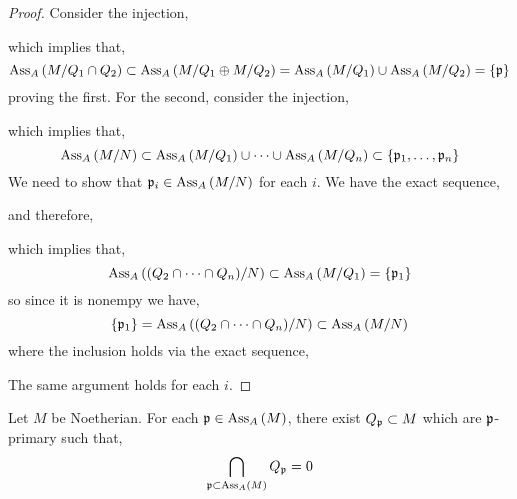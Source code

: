 \documentclass[12pt]{article}
\begin{document}
\begin{proof}
Consider the injection,
\begin{center}
\end{center}
which implies that,
\[ \mathrm{Ass}_{A}\left( M / Q_1 \cap Q_2 \right) \subset \mathrm{Ass}_{A}\left( M / Q_1 \oplus M / Q_2 \right) = \mathrm{Ass}_{A}\left( M/Q_1 \right) \cup \mathrm{Ass}_{A}\left( M/Q_2 \right) = \{ \mathfrak{p} \} \]
proving the first.
For the second, consider the injection,
\begin{center}
\end{center}
which implies that,
\[ \mathrm{Ass}_{A}\left( M / N \right) \subset \mathrm{Ass}_{A}\left( M/Q_1 \right) \cup \cdots \cup \mathrm{Ass}_{A}\left( M/Q_n \right) \subset \{ \mathfrak{p}_1, \dots, \mathfrak{p}_n \} \]
We need to show that $\mathfrak{p}_i \in \mathrm{Ass}_{A}\left( M / N \right)$ for each $i$.
We have the exact sequence,
\begin{center}
\end{center}
and therefore,
\begin{center}
\end{center}
which implies that,
\[ \mathrm{Ass}_{A}\left( (Q_2 \cap \cdots \cap Q_n) / N \right) \subset \mathrm{Ass}_{A}\left( M / Q_1 \right) = \{ \mathfrak{p}_1 \} \]
so since it is nonempy we have,
\[ \{ \mathfrak{p}_1 \} = \mathrm{Ass}_{A}\left( (Q_2 \cap \cdots \cap Q_n) / N \right) \subset \mathrm{Ass}_{A}\left( M / N \right) \]
where the inclusion holds via the exact sequence,
\begin{center}
\end{center}
The same argument holds for each $i$. 
\end{proof}

\begin{theorem}
Let $M$ be Noetherian. For each $\mathfrak{p} \in \mathrm{Ass}_{A}\left( M \right)$, there exist $Q_{\mathfrak{p}} \subset M$ which are $\mathfrak{p}$-primary such that,
\[ \bigcap_{\mathfrak{p} \subset \mathrm{Ass}_{A}\left( M \right)} Q_{\mathfrak{p}} = 0 \]
\end{theorem}
\end{document}
